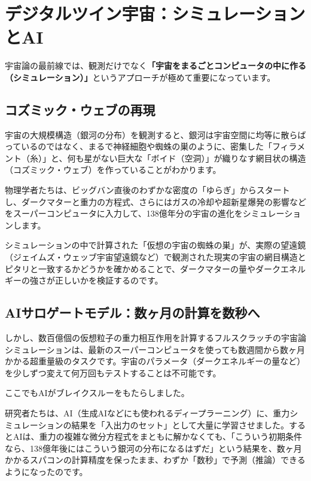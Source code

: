 \section{デジタルツイン宇宙：シミュレーションとAI}

宇宙論の最前線では、観測だけでなく\textbf{「宇宙をまるごとコンピュータの中に作る（シミュレーション）」}というアプローチが極めて重要になっています。

\subsection{コズミック・ウェブの再現}

宇宙の大規模構造（銀河の分布）を観測すると、銀河は宇宙空間に均等に散らばっているのではなく、まるで神経細胞や蜘蛛の巣のように、密集した「フィラメント（糸）」と、何も星がない巨大な「ボイド（空洞）」が織りなす網目状の構造（コズミック・ウェブ）を作っていることがわかります。

物理学者たちは、ビッグバン直後のわずかな密度の「ゆらぎ」からスタートし、ダークマターと重力の方程式、さらにはガスの冷却や超新星爆発の影響などをスーパーコンピュータに入力して、138億年分の宇宙の進化をシミュレーションします。

シミュレーションの中で計算された「仮想の宇宙の蜘蛛の巣」が、実際の望遠鏡（ジェイムズ・ウェッブ宇宙望遠鏡など）で観測された現実の宇宙の網目構造とピタリと一致するかどうかを確かめることで、ダークマターの量やダークエネルギーの強さが正しいかを検証するのです。

\subsection{AIサロゲートモデル：数ヶ月の計算を数秒へ}

しかし、数百億個の仮想粒子の重力相互作用を計算するフルスクラッチの宇宙論シミュレーションは、最新のスーパーコンピュータを使っても数週間から数ヶ月かかる超重量級のタスクです。宇宙のパラメータ（ダークエネルギーの量など）を少しずつ変えて何万回もテストすることは不可能です。

ここでもAIがブレイクスルーをもたらしました。

研究者たちは、AI（生成AIなどにも使われるディープラーニング）に、重力シミュレーションの結果を「入出力のセット」として大量に学習させました。するとAIは、重力の複雑な微分方程式をまともに解かなくても、「こういう初期条件なら、138億年後にはこういう銀河の分布になるはずだ」という結果を、数ヶ月かかるスパコンの計算精度を保ったまま、わずか「数秒」で予測（推論）できるようになったのです。

